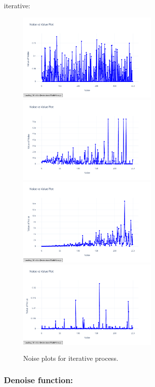 \documentclass{article}
\begin{document}
iterative: 

\begin{figure}[H]
    \centering
    \includegraphics[width=7cm]{noise_conservation_random_i}
    \includegraphics[width=7cm]{noise_Newtons_First_Law_random_i}
    \includegraphics[width=7cm]{noise_Newtons_Third_Law_random_i}
    \includegraphics[width=7cm]{noise_Simple_Harmonic_Motion_random_i}
    \caption{Noise plots for iterative process.}
    \label{fig:noise_iterative_plots}
\end{figure}


\subsubsection{Denoise function: }
\end{document}
